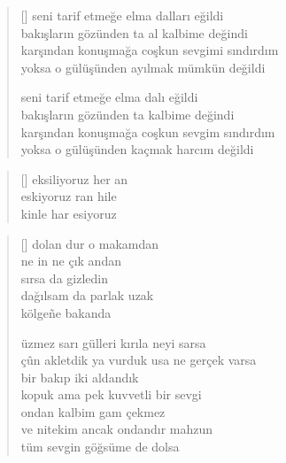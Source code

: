 \documentclass[10pt, openright, twoside]{memoir}
\theoremstyle{definition}
\begin{document}
%
\newpage
{}
\vspace*{\fill}
\settowidth{\versewidth}{karşından konuşmağa coşkun sevgimi sındırdım}
\begin{verse}[\versewidth]
  seni tarif etmeğe elma dalları eğildi \\
  bakışların gözünden ta al kalbime değindi \\
  karşından konuşmağa coşkun sevgimi sındırdım \\
  yoksa o gülüşünden ayılmak mümkün değildi

  seni tarif etmeğe elma dalı eğildi \\
  bakışların gözünden ta kalbime değindi \\
  karşından konuşmağa coşkun sevgim sındırdım \\
  yoksa o gülüşünden kaçmak harcım değildi \\
\end{verse}
\vspace*{\fill}
%
\newpage
{}
\vspace*{\fill}
\settowidth{\versewidth}{eksiliyoruz her an}
\begin{verse}[\versewidth]
  eksiliyoruz her an \\
  eskiyoruz ran hile \\
  kinle har esiyoruz
\end{verse}
\vspace*{\fill}
%
\newpage
{}
\vspace*{\fill}
\settowidth{\versewidth}{çûn akletdik ya vurduk usa ne gerçek varsa}
\begin{verse}[\versewidth]
  dolan dur o makamdan \\
  ne in ne çık andan \\
  sırsa da gizledin \\
  dağılsam da parlak uzak \\
  kölge\~ne bakanda

  üzmez sarı gülleri kırıla neyi sarsa \\
  çûn akletdik ya vurduk usa ne gerçek varsa \\
  bir bakıp iki aldandık \\
  kopuk ama pek kuvvetli bir sevgi \\
  ondan kalbim gam çekmez \\
  ve nitekim ancak ondandır mahzun \\
  tüm sevgin göğsüme de dolsa \\
\end{verse}
\end{document}
